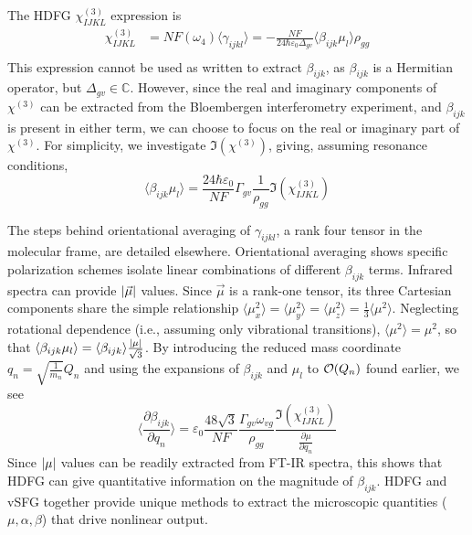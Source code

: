 \documentclass[aip, jcp, reprint, onecolumn]{revtex4-2}
\begin{document}
The HDFG $\chi^{(3)}_{IJKL}$ expression is
\begin{equation}\label{chi3}
\begin{split}
		\chi^{(3)}_{IJKL} &= NF(\omega_4) \langle \gamma_{ijkl} \rangle = -\frac{NF}{24 \hbar \varepsilon_0 \Delta_{gv}} \langle \beta_{ijk} \mu_l \rangle \rho_{gg}\\
\end{split}
\end{equation}
This expression cannot be used as written to extract $\beta_{ijk}$, as $\beta_{ijk}$ is a Hermitian operator, but $\Delta_{gv} \in \mathbb{C}$. 
However, since the real and imaginary components of $\chi^{(3)}$ can be extracted from the Bloembergen interferometry experiment, and $\beta_{ijk}$ is present in either term, we can choose to focus on the real or imaginary part of $\chi^{(3)}$.
For simplicity, we investigate $\Im(\chi^{(3)})$, giving, assuming resonance conditions, 
\begin{equation}
	\langle \beta_{ijk} \mu_{l} \rangle = \frac{24 \hbar \varepsilon_0}{NF} \Gamma_{gv} \frac{1}{\rho_{gg}} \Im(\chi^{(3)}_{IJKL})
\end{equation}

The steps behind orientational averaging of $\gamma_{ijkl}$, a rank four tensor in the molecular frame, are detailed elsewhere.\cite{Andrews1977, McDonnell2024}
Orientational averaging shows specific polarization schemes isolate linear combinations of different $\beta_{ijk}$ terms. 
Infrared spectra can provide $\abs{\vec{\mu}}$ values.
Since $\vec{\mu}$ is a rank-one tensor, its three Cartesian components share the simple relationship $\langle {\mu^2_x} \rangle = \langle {\mu^2_y} \rangle = \langle {\mu^2_z} \rangle = \frac{1}{3}\langle {\mu^2} \rangle$. \cite{RN459}
Neglecting rotational dependence (i.e., assuming only vibrational transitions), $\langle {\mu^2} \rangle = \mu^2$, so that $\langle \beta_{ijk} \mu_l \rangle = \langle \beta_{ijk} \rangle \frac{\abs{\mu}}{\sqrt{3}}$.
By introducing the reduced mass coordinate $q_n = \sqrt{\frac{1}{m_n}} Q_n$ and using the expansions of $\beta_{ijk}$ and $\mu_{l}$ to $\order{Q_n}$ found earlier, we see
\begin{equation}\label{betasive}
	\langle \frac{\partial \beta_{ijk}}{\partial q_n} \rangle = \varepsilon_0 \frac{48 \sqrt{3} }{NF}  \frac{\Gamma_{gv} \omega_{vg}}{\rho_{gg}} \frac{\Im(\chi^{(3)}_{IJKL})}{\frac{\partial \mu}{\partial q_n}}
\end{equation}
Since $\abs{\mu}$ values can be readily extracted from FT-IR spectra,\cite{RN412} this shows that HDFG can give quantitative information on the magnitude of $\beta_{ijk}$.
HDFG and vSFG together provide unique methods to extract the microscopic quantities ($\mu, \alpha, \beta$) that drive nonlinear output.
\end{document}

